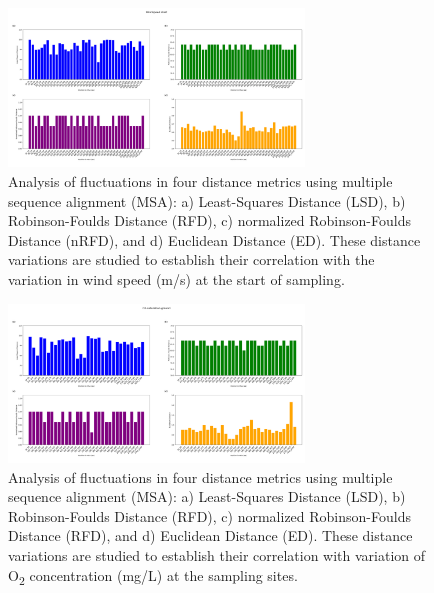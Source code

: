 \begin{figure}[]
    \centering
    \includegraphics[width=0.7\textwidth]{figure5.png}
     \caption{Analysis of fluctuations in four distance metrics using multiple sequence alignment (MSA): a) Least-Squares Distance (LSD), b) Robinson-Foulds Distance (RFD), c) normalized Robinson-Foulds Distance (nRFD), and d) Euclidean Distance (ED). These distance variations are studied to establish their correlation with the variation in wind speed (m/s) at the start of sampling. \label{fig:fig6}}
\end{figure}

\begin{figure}[]
    \centering
    \includegraphics[width=0.7\textwidth]{figure6.png}
    \caption{Analysis of fluctuations in four distance metrics using multiple sequence alignment (MSA): a) Least-Squares Distance (LSD), b) Robinson-Foulds Distance (RFD), c) normalized Robinson-Foulds Distance (RFD), and d) Euclidean Distance (ED). These distance variations are studied to establish their correlation with variation of O\textsubscript{2} concentration (mg/L) at the sampling sites. \label{fig:fig7}}
\end{figure}

